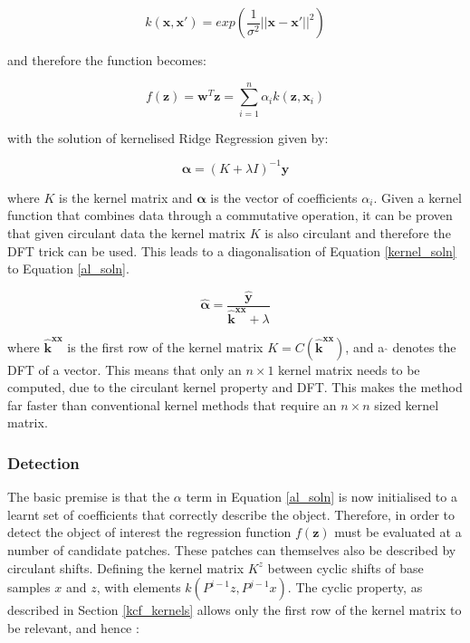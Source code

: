 \documentclass[a4paper,11pt,notitlepage]{article}
\begin{document}
\begin{equation}
k(\mathbf{x},\mathbf{x}') = exp (\frac{1}{\sigma^{2}} ||\mathbf{x} - \mathbf{x}'||^{2})
\label{gauss_kernel}
\end{equation}

and therefore the function becomes:

\begin{equation}
f(\mathbf{z}) = \mathbf{w}^{T}\mathbf{z} = \sum_{i=1}^{n} \alpha_{i}k(\mathbf{z},\mathbf{x}_{i})
\end{equation}

with the solution of kernelised Ridge Regression given by:

\begin{equation}
\mathbf{\alpha} = (K + \lambda I)^{-1} \mathbf{y}
\label{kernel_soln}
\end{equation}

where $K$ is the kernel matrix and $\mathbf{\alpha}$ is the vector of coefficients $\alpha_{i}$. Given a kernel function that combines data through a commutative operation, it can be proven that given circulant data the kernel matrix $K$ is also circulant and therefore the DFT trick can be used. This leads to a diagonalisation of Equation \ref{kernel_soln} to Equation \ref{al_soln}.

\begin{equation}
\mathbf{\hat{\alpha}} = \frac{\mathbf{\hat{y}}}{\mathbf{\hat{k}}^{\mathbf{xx}} + \lambda}
\label{al_soln}
\end{equation}

where $\mathbf{\hat{k}}^{\mathbf{xx}}$ is the first row of the kernel matrix $K = C(\mathbf{\hat{k}}^{\mathbf{xx}})$, and a $\hat{ }$ denotes the DFT of a vector. This means that only an $n \times 1$ kernel matrix needs to be computed, due to the circulant kernel property and DFT. This makes the method far faster than conventional kernel methods that require an $n \times n$ sized kernel matrix.


\subsubsection{Detection}

The basic premise is that the $\alpha$ term in Equation \ref{al_soln} is now initialised to a learnt set of coefficients that correctly describe the object. Therefore, in order to detect the object of interest the regression function $f(\mathbf{z})$ must be evaluated at a number of candidate patches.  These patches can themselves also be described by circulant shifts. Defining the kernel matrix $K^{z}$ between cyclic shifts of base samples $x$ and $z$, with elements $k(P^{i-1}z,P^{j-1}x)$. The cyclic property, as described in Section \ref{kcf_kernels} allows only the first row of the kernel matrix to be relevant, and hence :
\end{document}
